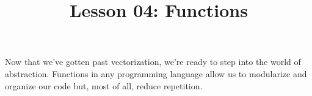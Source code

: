 \documentclass{article}
\title{Lesson 04: Functions}
\begin{document}
\renderTitle

Now that we've gotten past vectorization, we're ready to step into the
world of abstraction.  Functions in any programming language allow us to
modularize and organize our code but, most of all, reduce repetition.
\end{document}
